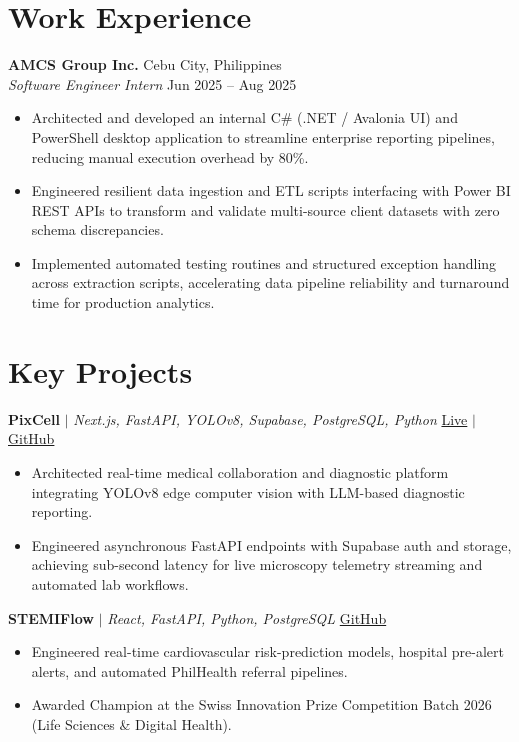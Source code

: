 \documentclass[10pt,letterpaper]{article}
\begin{document}
\section{Work Experience}
\textbf{AMCS Group Inc.} \hfill Cebu City, Philippines \\
\textit{Software Engineer Intern} \hfill Jun 2025 -- Aug 2025
\begin{itemize}
  \item Architected and developed an internal C\# (.NET / Avalonia UI) and PowerShell desktop application to streamline enterprise reporting pipelines, reducing manual execution overhead by 80\%.
  \item Engineered resilient data ingestion and ETL scripts interfacing with Power BI REST APIs to transform and validate multi-source client datasets with zero schema discrepancies.
  \item Implemented automated testing routines and structured exception handling across extraction scripts, accelerating data pipeline reliability and turnaround time for production analytics.
\end{itemize}

\section{Key Projects}
\textbf{PixCell} $|$ \textit{Next.js, FastAPI, YOLOv8, Supabase, PostgreSQL, Python} \hfill \href{https://pixcell-ai.vercel.app}{Live} $|$ \href{https://github.com/simon-escano/pixcell}{GitHub}
\begin{itemize}
  \item Architected real-time medical collaboration and diagnostic platform integrating YOLOv8 edge computer vision with LLM-based diagnostic reporting.
  \item Engineered asynchronous FastAPI endpoints with Supabase auth and storage, achieving sub-second latency for live microscopy telemetry streaming and automated lab workflows.
\end{itemize}

\vspace{2pt}
\textbf{STEMIFlow} $|$ \textit{React, FastAPI, Python, PostgreSQL} \hfill \href{https://github.com/simon-escano}{GitHub}
\begin{itemize}
  \item Engineered real-time cardiovascular risk-prediction models, hospital pre-alert alerts, and automated PhilHealth referral pipelines.
  \item Awarded Champion at the Swiss Innovation Prize Competition Batch 2026 (Life Sciences \& Digital Health).
\end{itemize}
\end{document}
